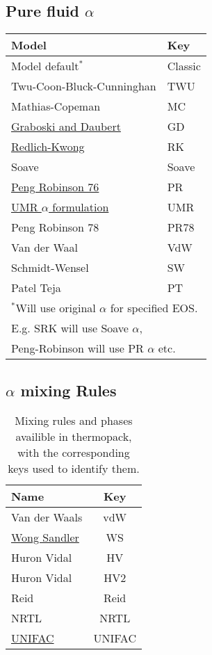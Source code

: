 \documentclass[english]{../thermomemo/thermomemo}
\newcommand{\mathsec}[1]{\texorpdfstring{#1}{TEXT}} %
\begin{document}
\subsection{Pure fluid \mathsec{$\alpha$}}
\begin{table}[ht!]
  \centering
  \begin{tabular}{l l}
    \toprule
    Model & Key \\
    \midrule
    Model default$^*$ & Classic\\
    Twu-Coon-Bluck-Cunninghan & TWU\\
    Mathias-Copeman & MC\\
    \href{https://pubs.acs.org/doi/abs/10.1021/i260068a009}{Graboski and Daubert} & GD\\
    \href{https://doi.org/10.1021/cr60137a013}{Redlich-Kwong} & RK\\
    Soave & Soave\\
    \href{https://doi.org/10.1021/i160057a011}{Peng Robinson 76} & PR\\
    \href{https://doi.org/10.1021/ie049580p}{UMR $\alpha$ formulation} & UMR\\
    Peng Robinson 78 & PR78\\
    Van der Waal & VdW\\
    Schmidt-Wensel & SW\\
    Patel Teja & PT\\
    \bottomrule
    \multicolumn{2}{l}{$^*$Will use original $\alpha$ for specified EOS.}\\
    \multicolumn{2}{l}{ E.g. SRK will use Soave $\alpha$,}\\
    \multicolumn{2}{l}{ Peng-Robinson will use PR $\alpha$ etc.}\\
  \end{tabular}
\end{table}

\subsection{\mathsec{$\alpha$} mixing Rules}
\begin{table}[ht!]
  \centering
  \begin{tabular}{l c}
    \toprule
    Name & Key \\
    \midrule
    Van der Waals & vdW\\
    \href{https://github.com/SINTEF/thermopack/tree/main/doc/memo/WongSandler/wongsandler.pdf}{Wong Sandler} & WS \\
    Huron Vidal & HV \\
    Huron Vidal & HV2 \\
    Reid & Reid \\
    NRTL & NRTL \\
    \href{https://github.com/SINTEF/thermopack/tree/main/doc/memo/UNIFAC/unifac.pdf}{UNIFAC} & UNIFAC \\
    \bottomrule
  \end{tabular}
  \caption{Mixing rules and phases availible in thermopack, with the corresponding keys used to identify them.}
  \label{tab:mixing_rules_thermopack}
\end{table}
\end{document}
